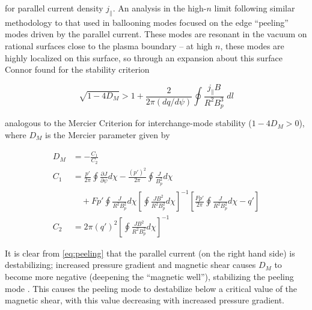 \noindent for parallel current density $j_\parallel$.  An analysis in the high-$n$ limit following similar methodology to that used in ballooning modes \cite{Connor1998a} focused on the edge ``peeling'' modes driven by the parallel current.  These modes are resonant in the vacuum on rational surfaces close to the plasma boundary -- at high $n$, these modes are highly localized on this surface, so through an expansion about this surface Connor \etal \cite{Connor1998a} found for the stability criterion

\begin{equation}\label{eq:peeling}
 \sqrt{1 - 4D_M} > 1 + \frac{2}{2\pi \left(dq/d\psi\right)} \oint \frac{j_\parallel B}{R^2 B_p^3} \;dl
\end{equation}

\noindent analogous to the Mercier Criterion \cite{Mercier1960} for interchange-mode stability ($1 - 4D_M > 0$), where $D_M$ is the Mercier parameter given by

\begin{equation}\label{eq:mercier}
 \begin{aligned}
  D_M &= -\frac{C_1}{C_2}\\
  C_1 &= \frac{p'}{2\pi} \oint \frac{\partial J}{\partial \psi} d\chi - \frac{\left(p'\right)^2}{2\pi} \oint \frac{J}{B_p^2} d\chi\\
  &\quad + Fp' \oint \frac{J}{R^2 B_p^2} d\chi \left[ \oint \frac{JB^2}{R^2 B_p^2} d\chi \right]^{-1} \left[ \frac{Fp'}{2\pi} \oint \frac{J}{R^2 B_p^2} d\chi - q' \right]\\
  C_2 &= 2\pi\left(q'\right)^2 \left[ \oint \frac{JB^2}{R^2 B_p^2} d\chi \right]^{-1}
 \end{aligned}
\end{equation}

\noindent It is clear from \cref{eq:peeling} that the parallel current (on the right hand side) is destabilizing; increased pressure gradient and magnetic shear causes $D_M$ to become more negative (deepening the ``magnetic well''), stabilizing the peeling mode \cite{Snyder2002,Snyder2004}.  This causes the peeling mode to destabilize below a critical value of the magnetic shear, with this value decreasing with increased pressure gradient.

